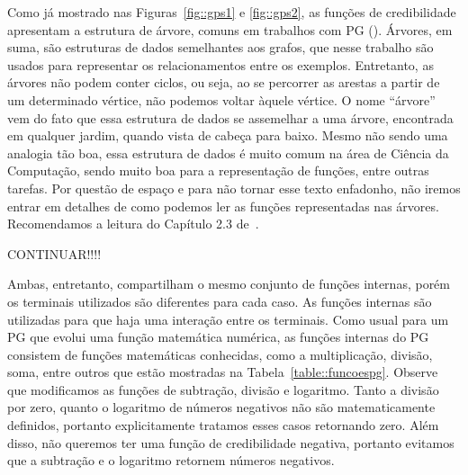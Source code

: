 Como já mostrado nas Figuras~\ref{fig::gps1} e \ref{fig::gps2}, as funções de credibilidade apresentam a estrutura de árvore, comuns em trabalhos com \textsc{PG} (\cite{Koza92}). 
Árvores, em suma, são estruturas de dados semelhantes aos grafos, que nesse trabalho são usados para representar os relacionamentos entre os exemplos.
Entretanto, as árvores não podem conter ciclos, ou seja, ao se percorrer as arestas a partir de um determinado vértice, não podemos voltar àquele vértice.
O nome ``árvore'' vem do fato que essa estrutura de dados se assemelhar a uma árvore, encontrada em qualquer jardim, quando vista de cabeça para baixo. 
Mesmo não sendo uma analogia tão boa, essa estrutura de dados é muito comum na área de Ciência da Computação, sendo muito boa para a representação de funções, entre outras tarefas.
Por questão de espaço e para não tornar esse texto enfadonho, não iremos entrar em detalhes de como podemos ler as funções representadas nas árvores. Recomendamos a leitura do Capítulo 2.3 de~\cite{Knuth97}.

CONTINUAR!!!!


Ambas, entretanto, compartilham o mesmo conjunto de funções internas, porém os terminais utilizados são diferentes para cada caso. As funções internas são utilizadas para que haja uma interação entre os terminais.
Como usual para um \textsc{PG} que evolui uma função matemática numérica, as funções internas do \textsc{PG} consistem de funções matemáticas conhecidas, como a multiplicação, divisão, soma, entre outros que estão mostradas na Tabela~\ref{table::funcoespg}. 
Observe que modificamos as funções de subtração, divisão e logaritmo.
Tanto a divisão por zero, quanto o logaritmo de números negativos não são matematicamente definidos, portanto explicitamente tratamos esses casos retornando zero. Além disso, não queremos ter uma função de credibilidade negativa, portanto evitamos que a subtração e o logaritmo retornem números negativos.

